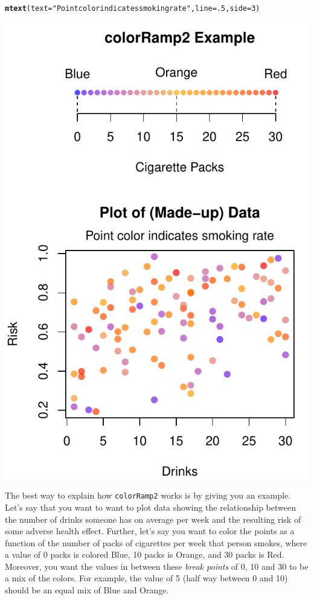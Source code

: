 \documentclass{tufte-book}\usepackage[]{graphicx}\usepackage[]{color}
\makeatletter
\def\maxwidth{ %
  \ifdim\Gin@nat@width>\linewidth
    \linewidth
  \else
    \Gin@nat@width
  \fi
}
\newcommand{\hlnum}[1]{\textcolor[rgb]{0.686,0.059,0.569}{#1}}%
\newcommand{\hlstr}[1]{\textcolor[rgb]{0.192,0.494,0.8}{#1}}%
\newcommand{\hlstd}[1]{\textcolor[rgb]{0.345,0.345,0.345}{#1}}%
\newcommand{\hlkwc}[1]{\textcolor[rgb]{0.333,0.667,0.333}{#1}}%
\newcommand{\hlkwd}[1]{\textcolor[rgb]{0.737,0.353,0.396}{\textbf{#1}}}%
\newenvironment{kframe}{%
 \def\at@end@of@kframe{}%
 \ifinner\ifhmode%
  \def\at@end@of@kframe{\end{minipage}}%
  \begin{minipage}{\columnwidth}%
 \fi\fi%
 \def\FrameCommand##1{\hskip\@totalleftmargin \hskip-\fboxsep
 \colorbox{shadecolor}{##1}\hskip-\fboxsep
     \hskip-\linewidth \hskip-\@totalleftmargin \hskip\columnwidth}%
 \MakeFramed {\advance\hsize-\width
   \@totalleftmargin\z@ \linewidth\hsize
   \@setminipage}}%
 {\par\unskip\endMakeFramed%
 \at@end@of@kframe}
\newenvironment{knitrout}{}{} %
\makeatother
\begin{document}
\begin{marginfigure}
\begin{tiny}
\begin{knitrout}
\begin{kframe}
\begin{alltt}
\hlkwd{mtext}\hlstd{(}\hlkwc{text} \hlstd{=} \hlstr{"Point color indicates smoking rate"}\hlstd{,} \hlkwc{line} \hlstd{=} \hlnum{.5}\hlstd{,} \hlkwc{side} \hlstd{=} \hlnum{3}\hlstd{)}
\end{alltt}
\end{kframe}
\includegraphics[width=\maxwidth]{figure/unnamed-chunk-230-1} 

\end{knitrout}
\end{tiny}
\label{fig:colorramp}
\end{marginfigure}


The best way to explain how \texttt{colorRamp2} works is by giving you an example. Let's say that you want to want to plot data showing the relationship between the number of drinks someone has on average per week and the resulting risk of some adverse health effect. Further, let's say you want to color the points as a function of the number of packs of cigarettes per week that person smokes, where a value of 0 packs is colored Blue, 10 packs is Orange, and 30 packs is Red. Moreover, you want the values in between these \textit{break points} of 0, 10 and 30 to be a mix of the colors. For example, the value of 5 (half way between 0 and 10) should be an equal mix of Blue and Orange.
\end{document}
